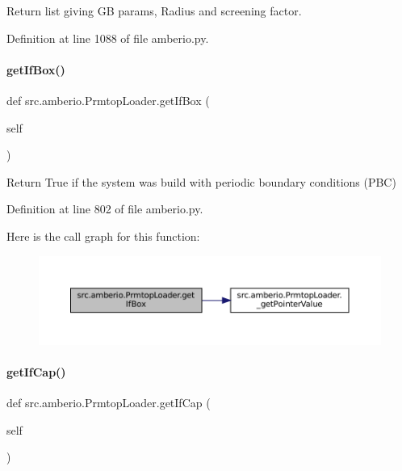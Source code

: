Return list giving GB params, Radius and screening factor. 



Definition at line 1088 of file amberio.\+py.

\mbox{\label{classsrc_1_1amberio_1_1PrmtopLoader_a7a05c20f7bf19b7138bd626a5199aab0}} 
\paragraph{\texorpdfstring{get\+If\+Box()}{getIfBox()}}
{\footnotesize\ttfamily def src.\+amberio.\+Prmtop\+Loader.\+get\+If\+Box (\begin{DoxyParamCaption}\item[{}]{self }\end{DoxyParamCaption})}



Return True if the system was build with periodic boundary conditions (P\+BC) 



Definition at line 802 of file amberio.\+py.

Here is the call graph for this function\+:
\nopagebreak
\begin{figure}[H]
\begin{center}
\leavevmode
\includegraphics[width=350pt]{classsrc_1_1amberio_1_1PrmtopLoader_a7a05c20f7bf19b7138bd626a5199aab0_cgraph}
\end{center}
\end{figure}
\mbox{\label{classsrc_1_1amberio_1_1PrmtopLoader_aa6d06c4f57b4eb15a5d0b82c616aab96}} 
\paragraph{\texorpdfstring{get\+If\+Cap()}{getIfCap()}}
{\footnotesize\ttfamily def src.\+amberio.\+Prmtop\+Loader.\+get\+If\+Cap (\begin{DoxyParamCaption}\item[{}]{self }\end{DoxyParamCaption})}



